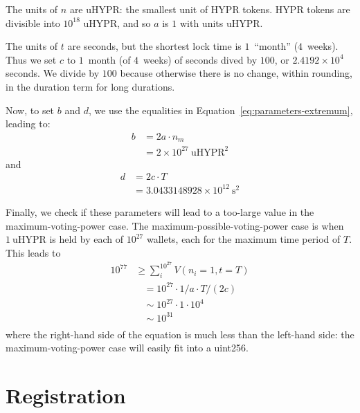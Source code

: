 \documentclass{article}
\begin{document}
The units of $n$ are uHYPR: the smallest unit of HYPR tokens.
HYPR tokens are divisible into $10^{18}$ uHYPR, and so $a$ is $1$ with units uHYPR.

The units of $t$ are seconds, but the shortest lock time is $1$~``month'' ($4$~weeks).
Thus we set $c$ to $1$~month (of $4$~weeks) of seconds dived by $100$, or $2.4192 \times 10^4$ seconds.
We divide by $100$ because otherwise there is no change, within rounding, in the duration term for long durations.

Now, to set $b$ and $d$, we use the equalities in Equation~\ref{eq:parameters-extremum}, leading to:
\begin{equation}
\begin{aligned}
b &= 2 a \cdot n_m \\
  &= 2 \times 10^{27}~\text{uHYPR}^2
\end{aligned}
\end{equation}
and
\begin{equation}
\begin{aligned}
d &= 2 c \cdot T \\
  &= 3.0433148928 \times 10^{12}~\text{s}^2
\end{aligned}
\end{equation}

Finally, we check if these parameters will lead to a too-large value in the maximum-voting-power case.
The maximum-possible-voting-power case is when $1~\text{uHYPR}$ is held by each of $10^{27}$ wallets, each for the maximum time period of $T$.
This leads to
\begin{equation}
\begin{aligned}
10^{77} & \geq \sum_i^{10^{27}} V(n_i = 1, t = T) \\
	&~~~~= 10^{27} \cdot 1/a \cdot T/(2 c) \\
	&~~~~\sim 10^{27} \cdot 1 \cdot 10^{4} \\
	&~~~~\sim 10^{31} \\
\end{aligned}
\end{equation}
where the right-hand side of the equation is much less than the left-hand side: the maximum-voting-power case will easily fit into a uint256.

\section{Registration}\label{sec:registration}
\end{document}
